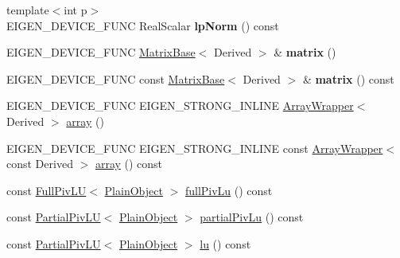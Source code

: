 \begin{DoxyCompactItemize}
\item 
\mbox{\label{class_eigen_1_1_matrix_base_a3312bfc4fd6b398acdadecbcedf7a1fc}} 
{\footnotesize template$<$int p$>$ }\\E\+I\+G\+E\+N\+\_\+\+D\+E\+V\+I\+C\+E\+\_\+\+F\+U\+NC Real\+Scalar {\bfseries lp\+Norm} () const
\item 
\mbox{\label{class_eigen_1_1_matrix_base_a11d5a9bc484759bc16d2f50179975a96}} 
E\+I\+G\+E\+N\+\_\+\+D\+E\+V\+I\+C\+E\+\_\+\+F\+U\+NC \mbox{\hyperlink{class_eigen_1_1_matrix_base}{Matrix\+Base}}$<$ Derived $>$ \& {\bfseries matrix} ()
\item 
\mbox{\label{class_eigen_1_1_matrix_base_a6b39d737ea6d0a61aea0bddb844e954c}} 
E\+I\+G\+E\+N\+\_\+\+D\+E\+V\+I\+C\+E\+\_\+\+F\+U\+NC const \mbox{\hyperlink{class_eigen_1_1_matrix_base}{Matrix\+Base}}$<$ Derived $>$ \& {\bfseries matrix} () const
\item 
E\+I\+G\+E\+N\+\_\+\+D\+E\+V\+I\+C\+E\+\_\+\+F\+U\+NC E\+I\+G\+E\+N\+\_\+\+S\+T\+R\+O\+N\+G\+\_\+\+I\+N\+L\+I\+NE \mbox{\hyperlink{class_eigen_1_1_array_wrapper}{Array\+Wrapper}}$<$ Derived $>$ \mbox{\hyperlink{class_eigen_1_1_matrix_base_a76a9dcb91ec82fbd6e74ca2ac2ae0e07}{array}} ()
\item 
E\+I\+G\+E\+N\+\_\+\+D\+E\+V\+I\+C\+E\+\_\+\+F\+U\+NC E\+I\+G\+E\+N\+\_\+\+S\+T\+R\+O\+N\+G\+\_\+\+I\+N\+L\+I\+NE const \mbox{\hyperlink{class_eigen_1_1_array_wrapper}{Array\+Wrapper}}$<$ const Derived $>$ \mbox{\hyperlink{class_eigen_1_1_matrix_base_a3cb1d2fad4e444eaa3ebca2d7db75a5e}{array}} () const
\item 
const \mbox{\hyperlink{class_eigen_1_1_full_piv_l_u}{Full\+Piv\+LU}}$<$ \mbox{\hyperlink{class_eigen_1_1_dense_base_aae45af9b5aca5a9caae98fd201f47cc4}{Plain\+Object}} $>$ \mbox{\hyperlink{class_eigen_1_1_matrix_base_a25da97d31acab0ee5d9d13bdbb0569da}{full\+Piv\+Lu}} () const
\item 
const \mbox{\hyperlink{class_eigen_1_1_partial_piv_l_u}{Partial\+Piv\+LU}}$<$ \mbox{\hyperlink{class_eigen_1_1_dense_base_aae45af9b5aca5a9caae98fd201f47cc4}{Plain\+Object}} $>$ \mbox{\hyperlink{class_eigen_1_1_matrix_base_a6199d8aaf26c1b8ac3097fdfa7733a1e}{partial\+Piv\+Lu}} () const
\item 
const \mbox{\hyperlink{class_eigen_1_1_partial_piv_l_u}{Partial\+Piv\+LU}}$<$ \mbox{\hyperlink{class_eigen_1_1_dense_base_aae45af9b5aca5a9caae98fd201f47cc4}{Plain\+Object}} $>$ \mbox{\hyperlink{class_eigen_1_1_matrix_base_afb312afbfe960cbda67811552d876fae}{lu}} () const

\end{DoxyCompactItemize}
